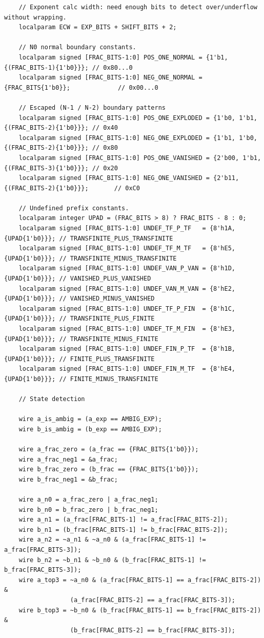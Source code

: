 \documentclass[12pt,letter]{article}
\begin{document}
\begin{lstlisting}
    // Exponent calc width: need enough bits to detect over/underflow without wrapping.
    localparam ECW = EXP_BITS + SHIFT_BITS + 2;

    // N0 normal boundary constants.
    localparam signed [FRAC_BITS-1:0] POS_ONE_NORMAL = {1'b1, {(FRAC_BITS-1){1'b0}}}; // 0x80...0
    localparam signed [FRAC_BITS-1:0] NEG_ONE_NORMAL = {FRAC_BITS{1'b0}};             // 0x00...0

    // Escaped (N-1 / N-2) boundary patterns
    localparam signed [FRAC_BITS-1:0] POS_ONE_EXPLODED = {1'b0, 1'b1, {(FRAC_BITS-2){1'b0}}}; // 0x40
    localparam signed [FRAC_BITS-1:0] NEG_ONE_EXPLODED = {1'b1, 1'b0, {(FRAC_BITS-2){1'b0}}}; // 0x80
    localparam signed [FRAC_BITS-1:0] POS_ONE_VANISHED = {2'b00, 1'b1, {(FRAC_BITS-3){1'b0}}}; // 0x20
    localparam signed [FRAC_BITS-1:0] NEG_ONE_VANISHED = {2'b11, {(FRAC_BITS-2){1'b0}}};       // 0xC0

    // Undefined prefix constants.
    localparam integer UPAD = (FRAC_BITS > 8) ? FRAC_BITS - 8 : 0;
    localparam signed [FRAC_BITS-1:0] UNDEF_TF_P_TF   = {8'h1A, {UPAD{1'b0}}}; // TRANSFINITE_PLUS_TRANSFINITE
    localparam signed [FRAC_BITS-1:0] UNDEF_TF_M_TF   = {8'hE5, {UPAD{1'b0}}}; // TRANSFINITE_MINUS_TRANSFINITE
    localparam signed [FRAC_BITS-1:0] UNDEF_VAN_P_VAN = {8'h1D, {UPAD{1'b0}}}; // VANISHED_PLUS_VANISHED
    localparam signed [FRAC_BITS-1:0] UNDEF_VAN_M_VAN = {8'hE2, {UPAD{1'b0}}}; // VANISHED_MINUS_VANISHED
    localparam signed [FRAC_BITS-1:0] UNDEF_TF_P_FIN  = {8'h1C, {UPAD{1'b0}}}; // TRANSFINITE_PLUS_FINITE
    localparam signed [FRAC_BITS-1:0] UNDEF_TF_M_FIN  = {8'hE3, {UPAD{1'b0}}}; // TRANSFINITE_MINUS_FINITE
    localparam signed [FRAC_BITS-1:0] UNDEF_FIN_P_TF  = {8'h1B, {UPAD{1'b0}}}; // FINITE_PLUS_TRANSFINITE
    localparam signed [FRAC_BITS-1:0] UNDEF_FIN_M_TF  = {8'hE4, {UPAD{1'b0}}}; // FINITE_MINUS_TRANSFINITE

    // State detection

    wire a_is_ambig = (a_exp == AMBIG_EXP);
    wire b_is_ambig = (b_exp == AMBIG_EXP);

    wire a_frac_zero = (a_frac == {FRAC_BITS{1'b0}});
    wire a_frac_neg1 = &a_frac;
    wire b_frac_zero = (b_frac == {FRAC_BITS{1'b0}});
    wire b_frac_neg1 = &b_frac;

    wire a_n0 = a_frac_zero | a_frac_neg1;
    wire b_n0 = b_frac_zero | b_frac_neg1;
    wire a_n1 = (a_frac[FRAC_BITS-1] != a_frac[FRAC_BITS-2]);
    wire b_n1 = (b_frac[FRAC_BITS-1] != b_frac[FRAC_BITS-2]);
    wire a_n2 = ~a_n1 & ~a_n0 & (a_frac[FRAC_BITS-1] != a_frac[FRAC_BITS-3]);
    wire b_n2 = ~b_n1 & ~b_n0 & (b_frac[FRAC_BITS-1] != b_frac[FRAC_BITS-3]);
    wire a_top3 = ~a_n0 & (a_frac[FRAC_BITS-1] == a_frac[FRAC_BITS-2]) &
                  (a_frac[FRAC_BITS-2] == a_frac[FRAC_BITS-3]);
    wire b_top3 = ~b_n0 & (b_frac[FRAC_BITS-1] == b_frac[FRAC_BITS-2]) &
                  (b_frac[FRAC_BITS-2] == b_frac[FRAC_BITS-3]);


\end{lstlisting}
\end{document}

